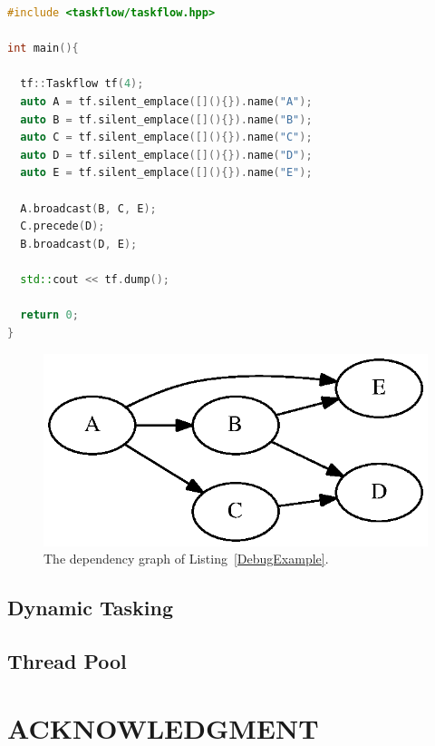 \documentclass[sigconf]{acmart}
\begin{document}
\begin{lstlisting}[language=C++,label=DebugExample,caption={A debugging example.}]
#include <taskflow/taskflow.hpp>  

int main(){
  
  tf::Taskflow tf(4);  
  auto A = tf.silent_emplace([](){}).name("A");
  auto B = tf.silent_emplace([](){}).name("B");
  auto C = tf.silent_emplace([](){}).name("C");
  auto D = tf.silent_emplace([](){}).name("D");
  auto E = tf.silent_emplace([](){}).name("E");
  
  A.broadcast(B, C, E); 
  C.precede(D);
  B.broadcast(D, E); 
  
  std::cout << tf.dump();

  return 0;
}
\end{lstlisting} 

\begin{figure}[htb]
 \centering
 \includegraphics[width=.6\columnwidth]{Fig/debug.eps}
  \caption{
    The dependency graph of Listing~\ref{DebugExample}.
  }
 \label{fig::debug}
\end{figure}


\subsection{Dynamic Tasking}



\subsection{Thread Pool}


\section{ACKNOWLEDGMENT}




%
%


\end{document}
